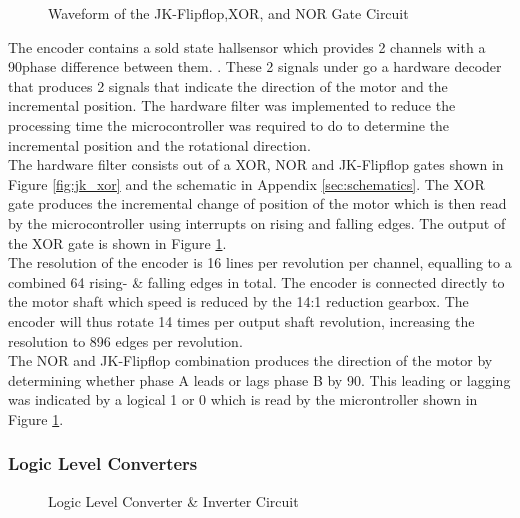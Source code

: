 \begin{figure}[h]
	\centering
	
	\caption{Waveform of the JK-Flipflop,XOR, and NOR Gate Circuit}
	\label{fig:jk_xor_waveform}
\end{figure}

The encoder contains a sold state hallsensor which provides 2 channels with a 90\textdegree \space phase difference between them. \citep{faulhaberencoder}. These 2 signals under go a hardware decoder that produces 2 signals that indicate the direction of the motor and the incremental position. The hardware filter was implemented to reduce the processing time the microcontroller was required to do to determine the incremental position and the rotational direction.\\

The hardware filter consists out of a XOR, NOR and JK-Flipflop gates shown in Figure \ref{fig:jk_xor} and the schematic in Appendix \ref{sec:schematics}. The XOR gate produces the incremental change of position of the motor which is then read by the microcontroller using interrupts on rising and falling edges. The output of the XOR gate is shown in Figure \ref{fig:jk_xor_waveform}.\\

The resolution of the encoder is 16 lines per revolution per channel, equalling to a combined 64 rising- \& falling edges in total. The encoder is connected directly to the motor shaft which speed is reduced by the 14:1 reduction gearbox. The encoder will thus rotate 14 times per output shaft revolution, increasing the resolution to 896 edges per revolution.\\

 The NOR and JK-Flipflop combination produces the direction of the motor by determining whether phase A leads or lags phase B by 90\textdegree. This leading or lagging was indicated by a logical 1 or 0 which is read by the microntroller shown in Figure \ref{fig:jk_xor_waveform}.\\
 
 \subsubsection{Logic Level Converters}
 \begin{figure}[h]
 	\centering
 	
 	\caption{Logic Level Converter \& Inverter Circuit}
 	\label{fig:interterCirc}
 \end{figure}
 
